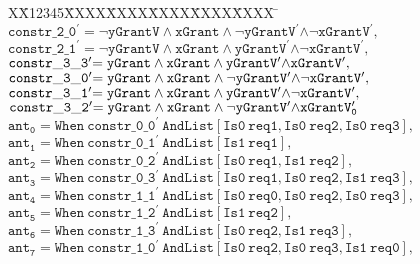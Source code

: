 \documentclass{article}
\newlength{\fminilength}
\newenvironment{fmini}[1][\linewidth]
  {\setlength{\fminilength}{#1\fboxsep-2\fboxrule}%
   \vspace{2ex}\noindent\begin{lrbox}{\fminibox}\begin{minipage}{\fminilength}%
   \mbox{ }\hfill\vspace{-2.5ex}}%
  {\end{minipage}\end{lrbox}\vspace{1ex}\hspace{0ex}%
   \framebox{\usebox{\fminibox}}}
\newenvironment{specification}
{\noindent\footnotesize\tt\begin{fmini}\begin{tabbing}X\=X12345\=XXXX\=XXXX\=XXXX\=XXXX\=XXXX
\=\+\kill} {\end{tabbing}\normalfont\end{fmini}}
\begin{document}
\begin{specification}
$\mathtt{constr\_2\_0}^{\prime }\mathtt{=\lnot yGrantV\wedge xGrant\wedge
\mathtt{\lnot yGrantV}^{\prime }\mathtt{\wedge \lnot xGrantV}^{\prime },}$%
\\

$\mathtt{constr\_2\_1}^{\prime }\mathtt{=\lnot yGrantV\wedge
xGrant\wedge \mathtt{yGrantV}^{\prime }\mathtt{\wedge \lnot
xGrantV}^{\prime },}$\\

$\mathtt{constr\_3\_3}^{\prime }\mathtt{=yGrant\wedge xGrant\wedge \mathtt{%
yGrantV}^{\prime }\mathtt{\wedge xGrantV}^{\prime },}$\\

$\mathtt{constr\_3\_0}^{\prime }\mathtt{=yGrant\wedge xGrant\wedge \mathtt{%
\lnot yGrantV}^{\prime }\mathtt{\wedge \lnot xGrantV}^{\prime },}$\\

$\mathtt{constr\_3\_1}^{\prime }\mathtt{=yGrant\wedge xGrant\wedge \mathtt{%
yGrantV}^{\prime }\mathtt{\wedge \lnot xGrantV}^{\prime },}$\\

$\mathtt{constr\_3\_2}^{\prime }\mathtt{=yGrant\wedge xGrant\wedge \mathtt{%
\lnot yGrantV}^{\prime }\mathtt{\wedge xGrantV}_{0}^{\prime }}$\\

$\mathtt{ant_{0}=When\ constr\_0\_0}^{\prime }\mathtt{\ AndList[Is0\
req1,Is0\ req2,Is0\ req3],}$\\

$\mathtt{ant_{1}=When\ constr\_0\_1}^{\prime }\mathtt{\ AndList[Is1\ req1],}$%
\\

$\mathtt{ant_{2}=When\ constr\_0\_2}^{\prime }\mathtt{\ AndList[Is0\
req1,Is1\ req2],}$\\

$ \mathtt{ant_{3}=When\ constr\_0\_3}^{\prime }\mathtt{\
AndList[Is0\ req1,Is0\ req2,Is1\ req3],}$\\

$ \mathtt{ant_{4}=When\ constr\_1\_1}^{\prime }\mathtt{\
AndList[Is0\ req0,Is0\ req2,Is0\ req3],}$\\

$\mathtt{ant_{5}=When\ constr\_1\_2}^{\prime }\mathtt{\ AndList[Is1\ req2],}$%
\\

$ \mathtt{ant_{6}=When\ constr\_1\_3}^{\prime }\mathtt{\
AndList[Is0\ req2,Is1\ req3],}$\\

$ \mathtt{ant_{7}=When\ constr\_1\_0}^{\prime }\mathtt{\
AndList[Is0\ req2,Is0\ req3,Is1\ req0],}$\\


\end{specification}
\end{document}
